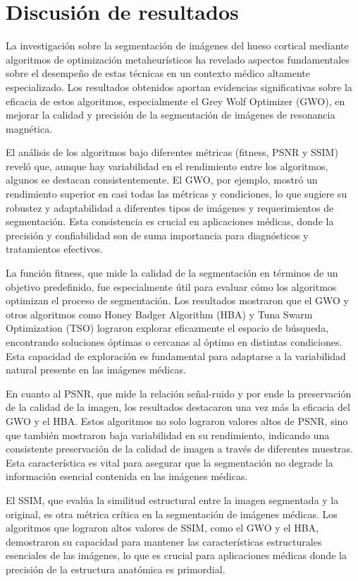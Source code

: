 \documentclass[conference]{IEEEtran}
\begin{document}
\section{Discusión de resultados} \label{sec:di}

\noindent La investigación sobre la segmentación de imágenes del hueso cortical mediante algoritmos de optimización metaheurísticos ha revelado aspectos fundamentales sobre el desempeño de estas técnicas en un contexto médico altamente especializado. Los resultados obtenidos aportan evidencias significativas sobre la eficacia de estos algoritmos, especialmente el Grey Wolf Optimizer (GWO), en mejorar la calidad y precisión de la segmentación de imágenes de resonancia magnética.

\noindent El análisis de los algoritmos bajo diferentes métricas (fitness, PSNR y SSIM) reveló que, aunque hay variabilidad en el rendimiento entre los algoritmos, algunos se destacan consistentemente. El GWO, por ejemplo, mostró un rendimiento superior en casi todas las métricas y condiciones, lo que sugiere su robustez y adaptabilidad a diferentes tipos de imágenes y requerimientos de segmentación. Esta consistencia es crucial en aplicaciones médicas, donde la precisión y confiabilidad son de suma importancia para diagnósticos y tratamientos efectivos.

\noindent La función fitness, que mide la calidad de la segmentación en términos de un objetivo predefinido, fue especialmente útil para evaluar cómo los algoritmos optimizan el proceso de segmentación. Los resultados mostraron que el GWO y otros algoritmos como Honey Badger Algorithm (HBA) y Tuna Swarm Optimization (TSO) lograron explorar eficazmente el espacio de búsqueda, encontrando soluciones óptimas o cercanas al óptimo en distintas condiciones. Esta capacidad de exploración es fundamental para adaptarse a la variabilidad natural presente en las imágenes médicas.

\noindent En cuanto al PSNR, que mide la relación señal-ruido y por ende la preservación de la calidad de la imagen, los resultados destacaron una vez más la eficacia del GWO y el HBA. Estos algoritmos no solo lograron valores altos de PSNR, sino que también mostraron baja variabilidad en su rendimiento, indicando una consistente preservación de la calidad de imagen a través de diferentes muestras. Esta característica es vital para asegurar que la segmentación no degrade la información esencial contenida en las imágenes médicas.

\noindent El SSIM, que evalúa la similitud estructural entre la imagen segmentada y la original, es otra métrica crítica en la segmentación de imágenes médicas. Los algoritmos que lograron altos valores de SSIM, como el GWO y el HBA, demostraron su capacidad para mantener las características estructurales esenciales de las imágenes, lo que es crucial para aplicaciones médicas donde la precisión de la estructura anatómica es primordial.
\end{document}
